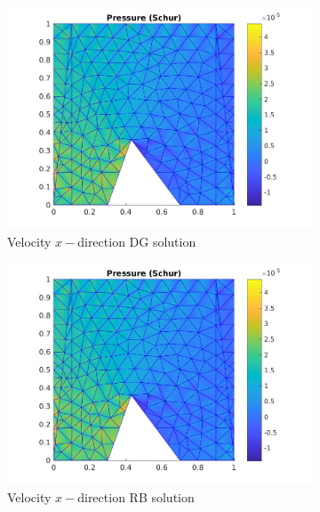 \documentclass[graybox]{svmult}
\begin{document}
\begin{figure}%
\begin{subfigure}{0.31\textwidth}
\includegraphics[width=\linewidth]{offline_pressure_at_43_36.jpg}
\caption{Velocity $x-$direction DG solution} \label{vel_x_dg}
\end{subfigure}\hspace*{\fill}
\begin{subfigure}{0.31\textwidth}
\includegraphics[width=\linewidth]{offline_pressure_at_43_36.jpg}
\caption{Velocity $x-$direction RB solution} \label{vel_x_rb}
\end{subfigure}
\begin{subfigure}{0.31\textwidth}

\end{subfigure}
\end{figure}
\end{document}
